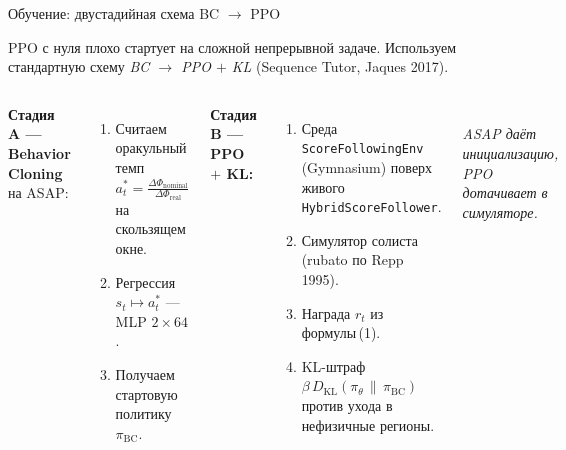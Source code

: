 ﻿%
\small

\begin{frame}{Обучение: двустадийная схема BC $\to$ PPO}
  \footnotesize\setlength{\abovedisplayskip}{2pt}
  \setlength{\belowdisplayskip}{2pt}

  PPO с нуля плохо стартует на сложной непрерывной задаче.
  Используем стандартную схему \emph{BC $\to$ PPO $+$ KL}
  (Sequence Tutor, Jaques 2017).

  \begin{columns}[T,onlytextwidth]
    \textbf{Стадия A --- Behavior Cloning} на ASAP:
    \begin{enumerate}\setlength{\itemsep}{0.2em}
      \item Считаем оракульный темп
            $\displaystyle a^{*}_t = \frac{\Delta\Phi_{\text{nominal}}}{\Delta\Phi_{\text{real}}}$
            на скользящем окне.
      \item Регрессия $s_t \mapsto a^{*}_t$ --- MLP $2\!\times\!64$.
      \item Получаем стартовую политику $\pi_{\text{BC}}$.
    \end{enumerate}

    \vspace{0.4em}
    \textbf{Стадия B --- PPO $+$ KL:}
    \begin{enumerate}\setlength{\itemsep}{0.2em}
      \item Среда \texttt{ScoreFollowingEnv} (Gymnasium) поверх
            живого \texttt{HybridScoreFollower}.
      \item Симулятор солиста (rubato по Repp 1995).
      \item Награда $r_t$ из формулы\,(1).
      \item KL-штраф
            $\beta\,D_{\text{KL}}(\pi_\theta\,\|\,\pi_{\text{BC}})$
            против ухода в нефизичные регионы.
    \end{enumerate}

    \centering
    \resizebox{\linewidth}{!}{%
    }\\[0.4em]
    {\scriptsize\itshape\color{black!70}
     ASAP даёт инициализацию,\\ PPO дотачивает в симуляторе.}
  \end{columns}
\end{frame}
